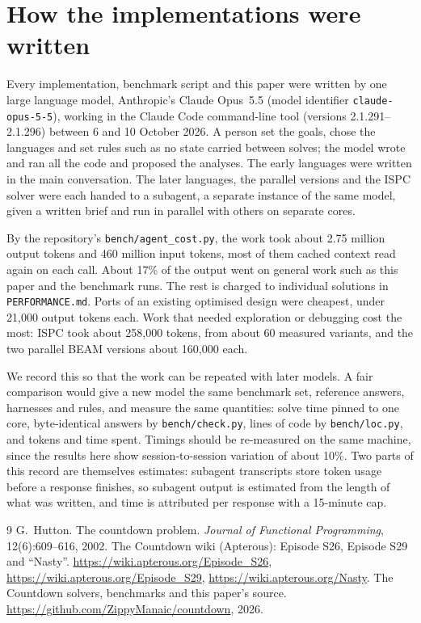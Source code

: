 \documentclass[11pt,a4paper]{article}
\theoremstyle{definition}
\theoremstyle{remark}
\begin{document}
\section{How the implementations were written}\label{sec:provenance}

Every implementation, benchmark script and this paper were written by one large language model, Anthropic's
Claude Opus~5.5 (model identifier \texttt{claude-opus-5-5}), working in the Claude Code command-line tool
(versions 2.1.291--2.1.296) between 6 and 10 October 2026. A person set the goals, chose the languages
and set rules such as no state carried between solves; the model wrote and ran all the code and
proposed the analyses. The early languages were written in the main conversation. The later
languages, the parallel versions and the ISPC solver were each handed to a subagent, a separate instance
of the same model, given a written brief and run in parallel with others on separate cores.

By the repository's \texttt{bench/agent\_cost.py}, the work took about 2.75 million output tokens and
460 million input tokens, most of them cached context read again on each call. About 17\% of the output
went on general work such as this paper and the benchmark runs. The rest is charged to individual
solutions in \texttt{PERFORMANCE.md}. Ports of an existing optimised design were cheapest, under
21{,}000 output tokens each. Work that needed exploration or debugging cost the most: ISPC took about
258{,}000 tokens, from about 60 measured variants, and the two parallel BEAM versions about 160{,}000 each.

We record this so that the work can be repeated with later models. A fair comparison would give a new model the same
benchmark set, reference answers, harnesses and rules, and measure the same quantities: solve time
pinned to one core, byte-identical answers by \texttt{bench/check.py}, lines of code by
\texttt{bench/loc.py}, and tokens and time spent. Timings should be re-measured on the same machine, since the
results here show session-to-session variation of about 10\%. Two parts of this record are themselves
estimates: subagent transcripts store token usage before a response finishes, so subagent output is estimated from the
length of what was written, and time is attributed per response with a 15-minute cap.

\begin{thebibliography}{9}
 G.~Hutton. The countdown problem. \emph{Journal of Functional Programming}, 12(6):609--616, 2002.
 The Countdown wiki (Apterous): Episode S26, Episode S29 and ``Nasty''. \url{https://wiki.apterous.org/Episode_S26}, \url{https://wiki.apterous.org/Episode_S29}, \url{https://wiki.apterous.org/Nasty}.
 The Countdown solvers, benchmarks and this paper's source. \url{https://github.com/ZippyManaic/countdown}, 2026.
\end{thebibliography}
\end{document}
